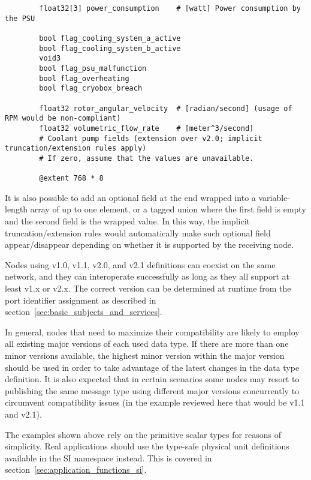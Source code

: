 \begin{remark}[breakable]
\begin{verbatim}
        float32[3] power_consumption    # [watt] Power consumption by the PSU

        bool flag_cooling_system_a_active
        bool flag_cooling_system_b_active
        void3
        bool flag_psu_malfunction
        bool flag_overheating
        bool flag_cryobox_breach

        float32 rotor_angular_velocity  # [radian/second] (usage of RPM would be non-compliant)
        float32 volumetric_flow_rate    # [meter^3/second]
        # Coolant pump fields (extension over v2.0; implicit truncation/extension rules apply)
        # If zero, assume that the values are unavailable.

        @extent 768 * 8
    \end{verbatim}

    It is also possible to add an optional field at the end wrapped into a variable-length
    array of up to one element, or a tagged union where the first field is empty
    and the second field is the wrapped value.
    In this way, the implicit truncation/extension rules would automatically make such optional field
    appear/disappear depending on whether it is supported by the receiving node.

    Nodes using v1.0, v1.1, v2.0, and v2.1 definitions can coexist on the same network,
    and they can interoperate successfully as long as they all support at least v1.x or v2.x.
    The correct version can be determined at runtime from the port identifier assignment as described in
    section~\ref{sec:basic_subjects_and_services}.

    In general, nodes that need to maximize their compatibility are likely to employ all existing major versions of
    each used data type.
    If there are more than one minor versions available, the highest minor version within the major version should
    be used in order to take advantage of the latest changes in the data type definition.
    It is also expected that in certain scenarios some nodes may resort to publishing the same message type
    using different major versions concurrently to circumvent compatibility issues
    (in the example reviewed here that would be v1.1 and v2.1).

    The examples shown above rely on the primitive scalar types for reasons of simplicity.
    Real applications should use the type-safe physical unit definitions available in the SI namespace instead.
    This is covered in section~\ref{sec:application_functions_si}.
\end{remark}
